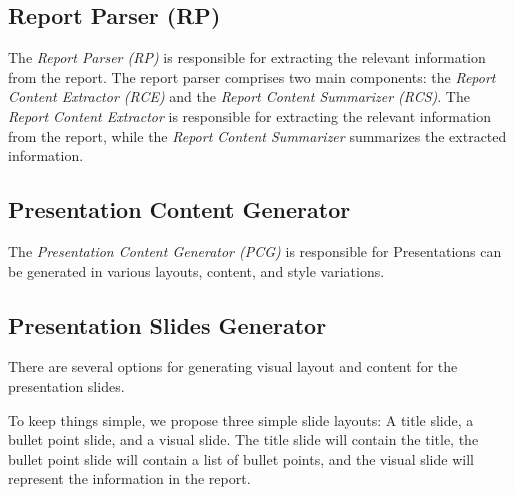 \subsection{Report Parser (RP)}
The \emph{Report Parser (RP)} is responsible for extracting the relevant information from the report. The report parser comprises two main components: the \emph{Report Content Extractor (RCE)} and the \emph{Report Content Summarizer (RCS)}. The \emph{Report Content Extractor} is responsible for extracting the relevant information from the report, while the \emph{Report Content Summarizer} summarizes the extracted information.

\subsection{Presentation Content Generator}
The \emph{Presentation Content Generator (PCG)} is responsible for 
Presentations can be generated in various layouts, content, and style variations. 

\subsection{Presentation Slides Generator}
There are several options for generating visual layout and content for the presentation slides. 

To keep things simple, we propose three simple slide layouts: A title slide, a bullet point slide, and a visual slide. The title slide will contain the title, the bullet point slide will contain a list of bullet points, and the visual slide will represent the information in the report.

